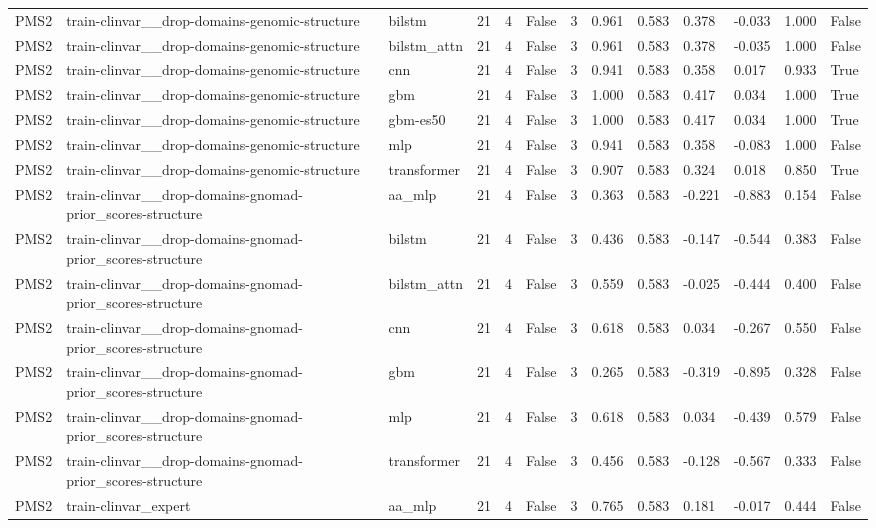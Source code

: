 \begin{table}[t]
\begin{tabular}{lllllllllllll}
PMS2 & train-clinvar\_\_drop-domains-genomic-structure & bilstm & 21 & 4 & False & 3 & 0.961 & 0.583 & 0.378 & -0.033 & 1.000 & False \\
PMS2 & train-clinvar\_\_drop-domains-genomic-structure & bilstm\_attn & 21 & 4 & False & 3 & 0.961 & 0.583 & 0.378 & -0.035 & 1.000 & False \\
PMS2 & train-clinvar\_\_drop-domains-genomic-structure & cnn & 21 & 4 & False & 3 & 0.941 & 0.583 & 0.358 & 0.017 & 0.933 & True \\
PMS2 & train-clinvar\_\_drop-domains-genomic-structure & gbm & 21 & 4 & False & 3 & 1.000 & 0.583 & 0.417 & 0.034 & 1.000 & True \\
PMS2 & train-clinvar\_\_drop-domains-genomic-structure & gbm-es50 & 21 & 4 & False & 3 & 1.000 & 0.583 & 0.417 & 0.034 & 1.000 & True \\
PMS2 & train-clinvar\_\_drop-domains-genomic-structure & mlp & 21 & 4 & False & 3 & 0.941 & 0.583 & 0.358 & -0.083 & 1.000 & False \\
PMS2 & train-clinvar\_\_drop-domains-genomic-structure & transformer & 21 & 4 & False & 3 & 0.907 & 0.583 & 0.324 & 0.018 & 0.850 & True \\
PMS2 & train-clinvar\_\_drop-domains-gnomad-prior\_scores-structure & aa\_mlp & 21 & 4 & False & 3 & 0.363 & 0.583 & -0.221 & -0.883 & 0.154 & False \\
PMS2 & train-clinvar\_\_drop-domains-gnomad-prior\_scores-structure & bilstm & 21 & 4 & False & 3 & 0.436 & 0.583 & -0.147 & -0.544 & 0.383 & False \\
PMS2 & train-clinvar\_\_drop-domains-gnomad-prior\_scores-structure & bilstm\_attn & 21 & 4 & False & 3 & 0.559 & 0.583 & -0.025 & -0.444 & 0.400 & False \\
PMS2 & train-clinvar\_\_drop-domains-gnomad-prior\_scores-structure & cnn & 21 & 4 & False & 3 & 0.618 & 0.583 & 0.034 & -0.267 & 0.550 & False \\
PMS2 & train-clinvar\_\_drop-domains-gnomad-prior\_scores-structure & gbm & 21 & 4 & False & 3 & 0.265 & 0.583 & -0.319 & -0.895 & 0.328 & False \\
PMS2 & train-clinvar\_\_drop-domains-gnomad-prior\_scores-structure & mlp & 21 & 4 & False & 3 & 0.618 & 0.583 & 0.034 & -0.439 & 0.579 & False \\
PMS2 & train-clinvar\_\_drop-domains-gnomad-prior\_scores-structure & transformer & 21 & 4 & False & 3 & 0.456 & 0.583 & -0.128 & -0.567 & 0.333 & False \\
PMS2 & train-clinvar\_expert & aa\_mlp & 21 & 4 & False & 3 & 0.765 & 0.583 & 0.181 & -0.017 & 0.444 & False \\

\end{tabular}
\end{table}
